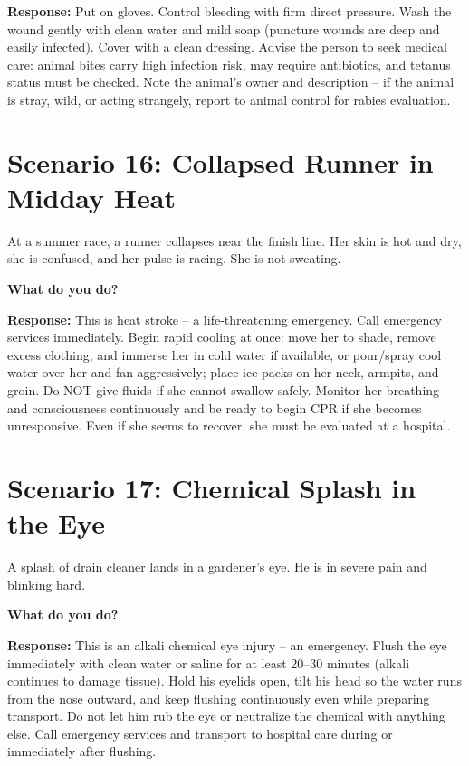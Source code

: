 \textbf{Response:} Put on gloves. Control bleeding with firm direct pressure. Wash the wound gently with clean water and mild soap (puncture wounds are deep and easily infected). Cover with a clean dressing. Advise the person to seek medical care: animal bites carry high infection risk, may require antibiotics, and tetanus status must be checked. Note the animal's owner and description -- if the animal is stray, wild, or acting strangely, report to animal control for rabies evaluation.

\section{Scenario 16: Collapsed Runner in Midday Heat}

At a summer race, a runner collapses near the finish line. Her skin is hot and dry, she is confused, and her pulse is racing. She is not sweating.

\textbf{What do you do?}

\textbf{Response:} This is heat stroke -- a life-threatening emergency. Call emergency services immediately. Begin rapid cooling at once: move her to shade, remove excess clothing, and immerse her in cold water if available, or pour/spray cool water over her and fan aggressively; place ice packs on her neck, armpits, and groin. Do NOT give fluids if she cannot swallow safely. Monitor her breathing and consciousness continuously and be ready to begin CPR if she becomes unresponsive. Even if she seems to recover, she must be evaluated at a hospital.

\section{Scenario 17: Chemical Splash in the Eye}

A splash of drain cleaner lands in a gardener's eye. He is in severe pain and blinking hard.

\textbf{What do you do?}

\textbf{Response:} This is an alkali chemical eye injury -- an emergency. Flush the eye immediately with clean water or saline for at least 20--30 minutes (alkali continues to damage tissue). Hold his eyelids open, tilt his head so the water runs from the nose outward, and keep flushing continuously even while preparing transport. Do not let him rub the eye or neutralize the chemical with anything else. Call emergency services and transport to hospital care during or immediately after flushing.

